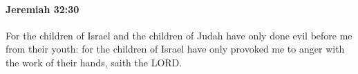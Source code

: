 
		\paragraph{Jeremiah 32:30} %
			\label{JEREMIAH-32-30}

			For the children of Israel and the children of Judah have only done evil before me from their youth: for the children of Israel have only provoked me to anger with the work of their hands, saith the LORD.


